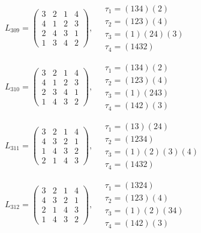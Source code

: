 $L_{309} = \begin{pmatrix} 3 & 2 & 1 & 4 \\ 4 & 1 & 2 & 3 \\ 2 & 4 & 3 & 1 \\ 1 & 3 & 4 & 2 \end{pmatrix}, \quad \begin{matrix} \tau_{1} = (1 3 4)(2) \\ \tau_{2} = (1 2 3)(4) \\ \tau_{3} = (1)(2 4)(3) \\ \tau_{4} = (1 4 3 2) \end{matrix}$

$L_{310} = \begin{pmatrix} 3 & 2 & 1 & 4 \\ 4 & 1 & 2 & 3 \\ 2 & 3 & 4 & 1 \\ 1 & 4 & 3 & 2 \end{pmatrix}, \quad \begin{matrix} \tau_{1} = (1 3 4)(2) \\ \tau_{2} = (1 2 3)(4) \\ \tau_{3} = (1)(2 4 3) \\ \tau_{4} = (1 4 2)(3) \end{matrix}$

$L_{311} = \begin{pmatrix} 3 & 2 & 1 & 4 \\ 4 & 3 & 2 & 1 \\ 1 & 4 & 3 & 2 \\ 2 & 1 & 4 & 3 \end{pmatrix}, \quad \begin{matrix} \tau_{1} = (1 3)(2 4) \\ \tau_{2} = (1 2 3 4) \\ \tau_{3} = (1)(2)(3)(4) \\ \tau_{4} = (1 4 3 2) \end{matrix}$

$L_{312} = \begin{pmatrix} 3 & 2 & 1 & 4 \\ 4 & 3 & 2 & 1 \\ 2 & 1 & 4 & 3 \\ 1 & 4 & 3 & 2 \end{pmatrix}, \quad \begin{matrix} \tau_{1} = (1 3 2 4) \\ \tau_{2} = (1 2 3)(4) \\ \tau_{3} = (1)(2)(3 4) \\ \tau_{4} = (1 4 2)(3) \end{matrix}$

